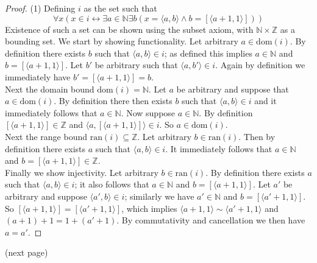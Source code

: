 \documentclass{report}
\begin{document}
\begin{proof}(1) Defining $i$ as the set such that
\begin{equation*}
\forall x(x\in i\leftrightarrow\exists a\in\mathbb N\exists b(x=\langle a,b\rangle\land b=[\langle a+1,1\rangle]))
\end{equation*}
Existence of such a set can be shown using the subset axiom, with $\mathbb N\times\mathbb Z$ as a bounding set. We start by showing functionality.
Let arbitrary $a\in\text{dom}(i)$. By definition there exists $b$ such that $\langle a,b\rangle\in i$; as defined this implies $a\in\mathbb N$ and 
$b=[\langle a+1,1\rangle]$.
Let $b'$ be arbitrary such that $\langle a,b'\rangle\in i$. Again by definition we immediately have $b'=[\langle a+1,1\rangle]=b$.\\
\indent Next the domain bound $\text{dom}(i)=\mathbb N$. Let $a$ be arbitrary and suppose that $a\in\text{dom}(i)$. By definition there then exists
$b$ such that $\langle a,b\rangle\in i$ and it immediately follows that $a\in\mathbb N$. Now suppose $a\in\mathbb N$.
By definition $[\langle a+1,1\rangle]\in\mathbb Z$ and $\langle a,[\langle a+1,1\rangle]\rangle\in i$. So $a\in\text{dom}(i)$.\\
\indent Next the range bound $\text{ran}(i)\subseteq\mathbb Z$. Let arbitrary $b\in\text{ran}(i)$. Then by definition there exists $a$ such that 
$\langle a,b\rangle\in i$. It immediately follows that $a\in\mathbb N$ and $b=[\langle a+1,1\rangle]\in\mathbb Z$.\\
\indent Finally we show injectivity. Let arbitrary $b\in\text{ran}(i)$. By definition there exists $a$ such that $\langle a,b\rangle\in i$; it 
also follows that $a\in\mathbb N$ and $b=[\langle a+1,1\rangle]$.
Let $a'$ be arbitrary and suppose $\langle a',b\rangle\in i$; similarly we have $a'\in\mathbb N$ and $b=[\langle a'+1,1\rangle]$.
So $[\langle a+1,1\rangle]=[\langle a'+1,1\rangle]$, which implies
$\langle a+1,1\rangle\sim\langle a'+1,1\rangle$ and 
$(a+1)+1=1+(a'+1)$. By commutativity and cancellation we then have $a=a'$.
\end{proof}
\noindent(next page)\newpage
\end{document}
